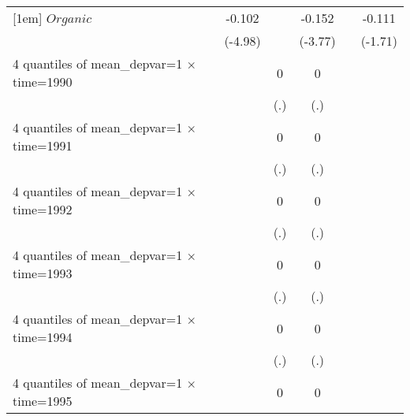 \begin{table}[htbp]
\begin{tabular}{l*{6}{c}}
[1em]
$ Organic $         &                     &      -0.102\sym{***}&                     &      -0.152\sym{***}&                     &      -0.111\sym{*}  \\
                    &                     &     (-4.98)         &                     &     (-3.77)         &                     &     (-1.71)         \\
[1em]
4 quantiles of mean\_depvar=1 $\times$ time=1990&                     &                     &           0         &           0         &                     &                     \\
                    &                     &                     &         (.)         &         (.)         &                     &                     \\
[1em]
4 quantiles of mean\_depvar=1 $\times$ time=1991&                     &                     &           0         &           0         &                     &                     \\
                    &                     &                     &         (.)         &         (.)         &                     &                     \\
[1em]
4 quantiles of mean\_depvar=1 $\times$ time=1992&                     &                     &           0         &           0         &                     &                     \\
                    &                     &                     &         (.)         &         (.)         &                     &                     \\
[1em]
4 quantiles of mean\_depvar=1 $\times$ time=1993&                     &                     &           0         &           0         &                     &                     \\
                    &                     &                     &         (.)         &         (.)         &                     &                     \\
[1em]
4 quantiles of mean\_depvar=1 $\times$ time=1994&                     &                     &           0         &           0         &                     &                     \\
                    &                     &                     &         (.)         &         (.)         &                     &                     \\
[1em]
4 quantiles of mean\_depvar=1 $\times$ time=1995&                     &                     &           0         &           0         &                     &                     \\

\end{tabular}
\end{table}
